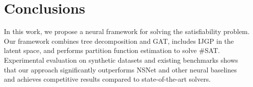 \section{Conclusions}
In this work, we propose a neural framework for solving the satisfiability problem. Our framework combines tree 
decomposition and GAT, includes IJGP in the latent space, and performs partition function estimation to solve \#SAT. 
Experimental evaluation on synthetic datasets and existing benchmarks shows that our approach significantly outperforms 
NSNet and other neural baselines and achieves competitive results compared to state-of-the-art solvers.
